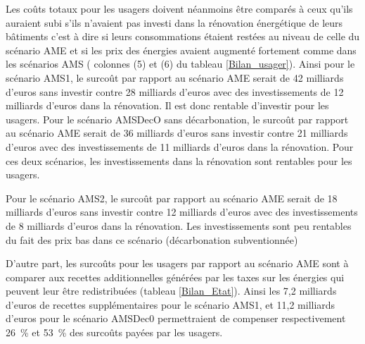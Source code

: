\documentclass[10.5pt,a4paper]{article}
\newcommand\cadrevert[3]{
\begin{encadre}

\color{vert_n} \fontsize{14}{13}\selectfont Zoom sur : \color{black} \fontsize{14}{13}\selectfont #1
\vspace{4mm}


\fontsize{9}{10}\selectfont #2

{\setlength{\parindent}{5mm}%
\fontsize{9}{10}\selectfont #3
}
\end{encadre}
}
\begin{document}
{Les coûts totaux pour les usagers doivent néanmoins être comparés à ceux qu'ils auraient subi s'ils n'avaient pas investi dans la rénovation énergétique de leurs bâtiments c'est à dire si leurs consommations étaient restées au niveau de celle du scénario AME et si les prix des énergies avaient augmenté fortement comme dans les scénarios AMS ( colonnes (5) et (6) du tableau \ref{Bilan_usager}). Ainsi pour le scénario AMS1, le surcoût par rapport au scénario AME serait de 42 milliards d'euros sans investir contre 28 milliards d'euros avec des investissements de 12 milliards d'euros dans la rénovation. Il est donc rentable d'investir pour les usagers. Pour le scénario AMSDecO sans décarbonation, le surcoût par rapport au scénario AME serait de 36 milliards d'euros sans investir contre 21 milliards d'euros avec des investissements de 11 milliards d'euros dans la rénovation. Pour ces deux scénarios, les investissements dans la rénovation sont rentables pour les usagers. 

Pour le scénario AMS2, le surcoût par rapport au scénario AME serait de 18 milliards d'euros sans investir contre 12 milliards d'euros avec des investissements de 8 milliards d'euros dans la rénovation. Les investissements sont peu rentables du fait des prix bas dans ce scénario (décarbonation subventionnée)

D'autre part, les surcoûts pour les usagers par rapport au scénario AME sont à comparer aux recettes additionnelles générées par les taxes sur les énergies qui peuvent leur être redistribuées (tableau \ref{Bilan_Etat}). Ainsi les 7,2 milliards d'euros de recettes supplémentaires pour le scénario AMS1, et 11,2 milliards d'euros pour le scénario AMSDec0 permettraient de compenser respectivement 26~\% et 53~\% des surcoûts payées par les usagers.


\newpage 
\clearpage 


}
\end{document}
